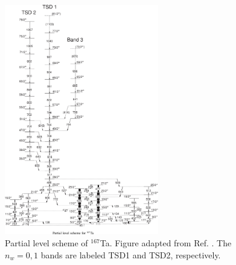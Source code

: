 \begin{figure}[ht!]
\centerline{\includegraphics[width=0.6\textwidth]{./img/c1/167Ta_scheme.png}}
	\caption{Partial level scheme of $^{167}$Ta. Figure adapted from Ref. \cite{wobblingIn167Ta}. The $n_w=0,1$ bands are labeled TSD1 and TSD2, respectively.\label{fig:chp1-last-wobb}}
\end{figure}

